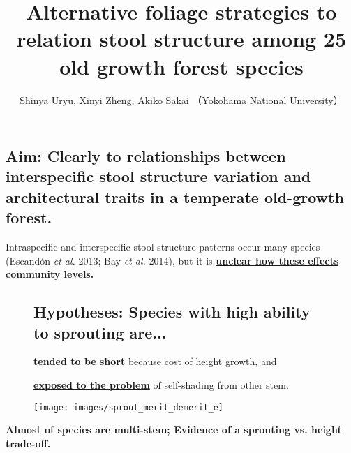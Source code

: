 \documentclass[a0, 25, plainboxedsections]{sciposter} %
\title{\textcolor{Blue1}{Alternative foliage strategies to relation stool structure among 25 old growth forest species}} %
\author{\underline{Shinya Uryu}, Xinyi Zheng, Akiko Sakai （Yokohama National University） \normalsize{\faEnvelope \hspace{0.02em} \fontspec{HelveticaNeue-Italic}{suika1127@gmail.com}}}
\begin{document}
\maketitle
\vspace{-2em}
\begin{multicols}{2}
\begin{mdframed}[style=section.frame]
  \LARGE\textbf{\color{white}{\faRocket INTRODUCTION}}
\end{mdframed}

\vspace{-0.6em}\subsection*{Aim: Clearly to relationships between interspecific stool structure variation and architectural traits in a temperate old-growth forest.}

Intraspecific and interspecific stool structure patterns occur many species {\footnotesize(Escandón \textit{et al.} 2013; Bay \textit{et al.} 2014)}, but it is \textbf{\underline{unclear how these effects community levels.}}

\vspace{-0.6em}\begin{figure}
 \begin{minipage}{0.6\hsize}
 \subsection*{Hypotheses: Species with high ability to sprouting are...}
   \underline{\textbf{tended to be short}} because cost of height growth, and
  
   \underline{\textbf{exposed to the problem}} of self-shading from other stem.

 \end{minipage}
 \begin{minipage}{0.4\hsize}
  \centering
   \texttt{[image: images/sprout\_merit\_demerit\_e]}
 \end{minipage}
\end{figure}



\columnbreak
\begin{mdframed}[style=conclusion.frame,frametitle={\textbf{\Large{\faFlagAlt \vspace{0.02em} SYNTHESIS: {Sprout ability is evolved to against tree height, and promoted species coexistence.}}}}]
  \vspace{0.4em}
  \flushleft
  \normalsize{
  \textbf{Almost of species are multi-stem; Evidence of a sprouting vs. height trade-off.}
  
}
\end{mdframed}
\end{multicols}
\end{document}
